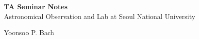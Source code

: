 \documentclass[11pt,a4paper]{book}
\begin{document}
\begingroup
\thispagestyle{empty}
\centering
\vspace*{5cm}
\par\normalfont\fontsize{35}{35}\sffamily\selectfont
\textbf{TA Seminar Notes}\\
{\LARGE Astronomical Observation and Lab at Seoul National University}\par %
\vspace*{1cm}
{\Huge Yoonsoo P. Bach}\par %
\endgroup

\tableofcontents





\end{document}
